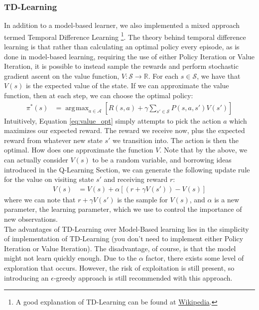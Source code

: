 \documentclass[letterpaper]{article}
\DeclareMathOperator*{\argmax}{\arg\!\max}
\begin{document}
\subsubsection{TD-Learning}
\label{sec:td-learning}
In addition to a model-based learner, we also implemented a mixed approach termed Temporal Difference Learning \footnote{A good explanation of TD-Learning can be found at \href{http://en.wikipedia.org/wiki/Temporal_difference_learning}{Wikipedia}.}. The theory behind temporal difference learning is that rather than calculating an optimal policy every episode, as is done in model-based learning, requiring the use of either Policy Iteration or Value Iteration, it is possible to instead sample the rewards and perform stochastic gradient ascent on the value function, $V: \mathcal{S} \to \mathbb{R}$. For each $s \in \mathcal{S}$, we have that $V(s)$ is the expected value of the state. If we can approximate the value function, then at each step, we can choose the optimal policy:
\begin{align}
\pi^*(s) &= \argmax_{a \in \mathcal{A}} \left[R(s,a) + \gamma \sum_{s' \in \mathcal{S}} P(s,a,s')V(s')\right] \label{eq:value_opt}
\end{align}
Intuitively, Equation \ref{eq:value_opt} simply attempts to pick the action $a$ which maximizes our expected reward. The reward we receive now, plus the expected reward from whatever new state $s'$ we transition into. The action is then the optimal. How does one approximate the function $V$. Note that by the above, we can actually consider $V(s)$ to be a random variable, and borrowing ideas introduced in the Q-Learning Section, we can generate the following update rule for the value on visiting state $s'$ and receiving reward $r$:
\begin{align}
V(s) &= V(s) + \alpha\left[(r + \gamma V(s')) - V(s) \right]
\end{align}
where we can note that $r + \gamma V(s')$ is the sample for $V(s)$, and $\alpha$ is a new parameter, the learning parameter, which we use to control the importance of new observations. \\

The advantages of TD-Learning over Model-Based learning lies in the simplicity of implementation of TD-Learning (you don't need to implement either Policy Iteration or Value Iteration). The disadvantage, of course, is that the model might not learn quickly enough. Due to the $\alpha$ factor, there exists some level of exploration that occurs. However, the risk of exploitation is still present, so introducing an $\epsilon$-greedy approach is still recommended with this approach.\\
\end{document}
